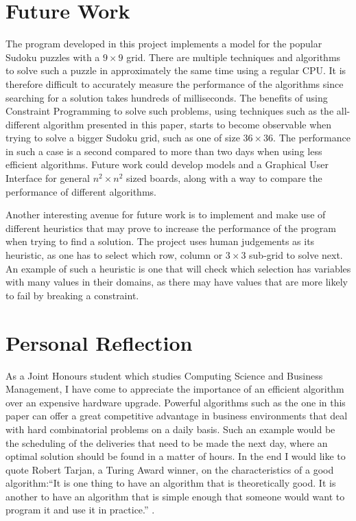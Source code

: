 \documentclass{l4proj}
\begin{document}
\section{Future Work}
\noindent The program developed in this project implements a model for the popular Sudoku puzzles with a $9 \times 9$ grid. There are multiple techniques and algorithms to solve such a puzzle in approximately the same time using a regular CPU. It is therefore difficult to accurately measure the performance of the algorithms since searching for a solution takes hundreds of milliseconds. The benefits of using Constraint Programming to solve such problems, using techniques such as the all-different algorithm presented in this paper, starts to become observable when trying to solve a bigger Sudoku grid, such as one of size $36 \times 36$. The performance in such a case is a second compared to more than two days when using less efficient algorithms. Future work could develop models and a Graphical User Interface for general $n^2\times n^2$ sized boards, along with a way to compare the performance of different algorithms.

\noindent Another interesting avenue for future work is to implement and make use of different heuristics that may prove to increase the performance of the program when trying to find a solution. The project uses human judgements as its heuristic, as one has to select which row, column or $3 \times 3$ sub-grid to solve next. An example of such a heuristic is one that will check which selection has variables with many values in their domains, as there may have values that are more likely to fail by breaking a constraint.

\section{Personal Reflection}
As a Joint Honours student which studies Computing Science and Business Management, I have come to appreciate the importance of an efficient algorithm over an expensive hardware upgrade. Powerful algorithms such as the one in this paper can offer a great competitive advantage in business environments that deal with hard combinatorial problems on a daily basis. Such an example would be the scheduling of the deliveries that need to be made the next day, where an optimal solution should be found in a matter of hours. In the end I would like to quote Robert Tarjan, a Turing Award winner, on the characteristics of a good algorithm:``It is one thing to have an algorithm that is theoretically good. It is another to have an algorithm that is simple enough that someone would want to program it and use it in practice.'' \cite{tarjanart}.
\end{document}
